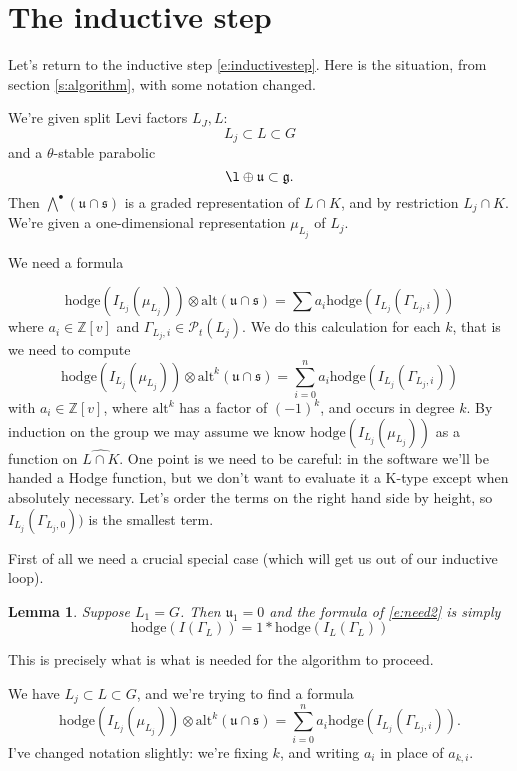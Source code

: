 \documentclass[12pt,leqno]{article}
\newtheorem{lemma}[equation]{Lemma}
\newcommand{\hodge}{\text{hodge}}
\newcommand\Pt{\mathcal P_t}
\newcommand{\alt}{\text{alt}}
\newcommand{\bigwedgedot}{\mathcal \bigwedge^{\bullet}}
\newcommand{\Z}{\mathbb Z}
\renewcommand{\u}{\mathfrak u}
\renewcommand{\sec}[1]{\section{#1}
\renewcommand{\theequation}{\thesection.\arabic{equation}}
  \setcounter{equation}{0}}
\newcommand{\g}{\mathfrak g}
\newcommand{\s}{\mathfrak s}
\newcommand{\LKhat}{\widehat{L\cap K}}
\renewcommand{\sec}[1]{\section{#1}
\renewcommand{\theequation}{\thesection.\arabic{equation}}
  \setcounter{equation}{0}}
\begin{document}
\sec{The inductive step}
\label{s:inductive}

Let's return to the inductive step \eqref{e:inductivestep}. Here is
the situation, from   section \ref{s:algorithm}, with some notation changed.

We're given split Levi factors $L_J,L$:
$$
L_j\subset L\subset G
$$
and a $\theta$-stable parabolic
$$
\l\oplus\u\subset\g.
$$
Then $\bigwedgedot(\u\cap\s)$ is a graded representation of $L\cap K$, and by restriction $L_j\cap K$.
We're given a one-dimensional representation $\mu_{L_j}$ of $L_j$.

We need a formula

\begin{equation}
\label{e:need}
\hodge(I_{L_j}(\mu_{L_j}))\otimes\alt(\u\cap\s)=\sum a_i \hodge(I_{L_j}(\Gamma_{L_j,i}))
\end{equation}
where $a_i\in\Z[v]$ and $\Gamma_{L_j,i}\in\Pt(L_j)$.
We do this calculation for each $k$,
that is we need to compute
\begin{equation}
\label{e:need2}
\hodge(I_{L_j}(\mu_{L_j}))\otimes\alt^k(\u\cap\s)=\sum_{i=0}^n a_i\hodge(I_{L_j}(\Gamma_{L_j,i}))
\end{equation}
with $a_i\in\Z[v]$, where $\alt^k$ has a factor of $(-1)^k$, and
occurs in degree $k$.  By induction on the group we may assume we know
$\hodge(I_{L_j}(\mu_{L_j}))$ as a function on $\LKhat$.
One point is we need to be careful: in the software we'll be handed a Hodge function,
but we don't want to evaluate it a K-type except when absolutely necessary.
Let's order the terms
on the right hand side by height, so $I_{L_j}(\Gamma_{L_j,0}))$ is the
smallest term.

First of all we need a crucial special case (which will get us out of our inductive loop).

\begin{lemma}
  Suppose $L_1=G$. Then $\u_1=0$ and the formula of \eqref{e:need2} is simply
{\normalfont
$$
\hodge(I(\Gamma_L))=1*\hodge(I_L(\Gamma_L))
$$
}
\end{lemma}

This is precisely what is what is needed for the algorithm to proceed.



We have $L_j\subset L\subset G$, and we're trying to find
a formula
\begin{equation}
\label{e:find}
\hodge(I_{L_j}(\mu_{L_j}))\otimes\alt^k(\u\cap\s)=\sum_{i=0}^n a_i\hodge(I_{L_j}(\Gamma_{L_j,i})).
\end{equation}
I've changed notation slightly: we're fixing $k$, and writing $a_i$ in place of $a_{k,i}$.
\end{document}
